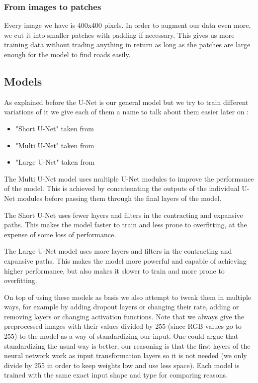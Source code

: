 \documentclass[10pt,conference,compsocconf]{IEEEtran}
\begin{document}
\subsubsection{From images to patches}
Every image we have is 400x400 pixels. In order to augment our data even more, we cut it into smaller patches with padding if necessary. This gives us more training data without trading anything in return as long as the patches are large enough for the model to find roads easily.
\subsection{Models}
\label{models}
As explained before the U-Net is our general model but we try to train different variations of it we give each of them a name to talk about them easier later on :
\begin{itemize}
\item "Short U-Net" taken from \cite{short-unet}
\item "Multi U-Net" taken from \cite{multi-unet}
\item "Large U-Net" taken from \cite{large-unet}
\end{itemize}
The Multi U-Net model uses multiple U-Net modules to improve the performance of the model. This is achieved by concatenating the outputs of the individual U-Net modules before passing them through the final layers of the model.

The Short U-Net uses fewer layers and filters in the contracting and expansive paths. This makes the model faster to train and less prone to overfitting, at the expense of some loss of performance.

The Large U-Net model uses more layers and filters in the contracting and expansive paths. This makes the model more powerful and capable of achieving higher performance, but also makes it slower to train and more prone to overfitting.

On top of using these models as basis we also attempt to tweak them in multiple ways, for example by adding dropout layers or changing their rate, adding or removing layers or changing activation functions.
Note that we always give the preprocessed images with their values divided by 255 (since RGB values go to 255) to the model as a way of standardizing our input. One could argue that standardizing the usual way is better, our reasoning is that the first layers of the neural network work as input transformation layers so it is not needed (we only divide by 255 in order to keep weights low and use less space). Each model is trained with the same exact input shape and type for comparing reasons.
\end{document}
